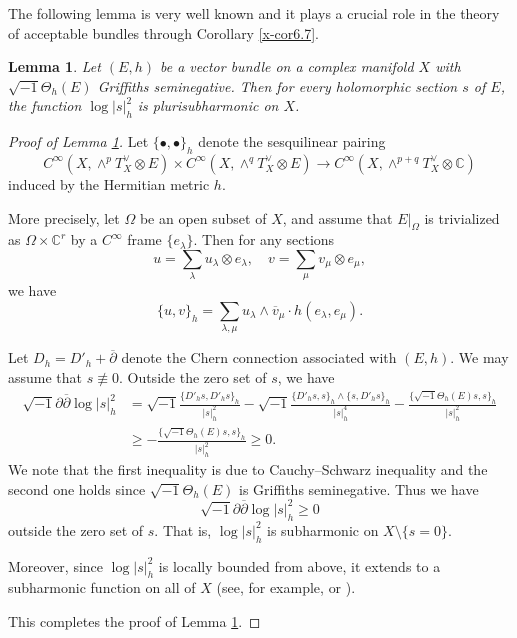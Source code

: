 \documentclass[12pt,twoside]{amsart}
\newtheorem{lem}[thm]{Lemma}
\theoremstyle{definition}
\begin{document}
The following lemma is very well known and it plays a crucial role 
in the theory of acceptable bundles through Corollary \ref{x-cor6.7}. 

\begin{lem}\label{x-lem6.9}
Let $(E,h)$ be a vector bundle on a complex manifold $X$ with
$\sqrt{-1}\Theta_h(E)$ Griffiths seminegative.
Then for every holomorphic section $s$ of $E$, the function $\log|s|^2_h$ is
plurisubharmonic on $X$.
\end{lem}

\begin{proof}[Proof of Lemma \ref{x-lem6.9}]
Let $\{\bullet, \bullet\}_h$ denote the sesquilinear pairing
\[
C^\infty(X, \wedge^p T^\vee_X \otimes E) \times 
C^\infty(X, \wedge^q T^\vee_X \otimes E) \to 
C^\infty(X, \wedge^{p+q} T^\vee_X \otimes \mathbb{C})
\]
induced by the Hermitian metric $h$.

More precisely, let $\Omega$ be an open subset of $X$, 
and assume that $E|_\Omega$ is trivialized 
as $\Omega\times \mathbb C^r$ by a $C^\infty$ frame $\{e_\lambda\}$. 
Then for any sections
\[
u = \sum_\lambda u_\lambda \otimes e_\lambda,
\quad 
v = \sum_\mu v_\mu \otimes e_\mu,
\]
we have
\[
\{u, v\}_h = \sum_{\lambda, \mu} u_\lambda \wedge 
\overline v_\mu \cdot h(e_\lambda, e_\mu).
\]

Let $D_h = D'_h + \overline{\partial}$ denote the Chern 
connection associated with $(E, h)$. 
We may assume that $s\not\equiv 0$. 
Outside the zero set of $s$, we have 
\[
\begin{split}
\sqrt{-1}\partial \overline\partial \log |s|^2_h&= \sqrt{-1} \frac{\{D'_hs, D'_hs\}_h}{|s|^2_h} 
-\sqrt{-1} \frac{\{D'_hs, s\}_h\wedge \{s, D'_hs\}_h} {|s|^4_h} 
-\frac{\{\sqrt{-1} \Theta_h(E)s, s\}_h}{|s|^2_h} \\ 
&\geq -\frac{\{\sqrt{-1} \Theta_h(E)s, s\}_h}{|s|^2_h}\geq 0. 
\end{split}
\] 
We note that the first inequality is due to Cauchy--Schwarz inequality and 
the second one holds since $\sqrt{-1} \Theta_h (E)$ is Griffiths seminegative. 
Thus we have 
\[
\sqrt{-1} \partial \overline{\partial} \log |s|^2_h \geq 0
\]
outside the zero set of $s$. That is, 
$\log |s|^2_h$ is subharmonic on $X \setminus \{s = 0\}$. 

Moreover, since $\log |s|^2_h$ is 
locally bounded from above, it extends to a subharmonic function on all of $X$ (see, for example, 
\cite[(3.3.41) Theorem]{noguchi-ochiai} or  
\cite[Chapter~I, (5.24) Theorem]{demailly}). 

This completes the proof of Lemma \ref{x-lem6.9}.
\end{proof}
\end{document}

